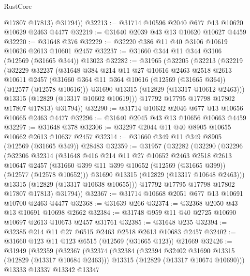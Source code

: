 \begin{lexlean}{RustCore}
\begin{coremodule}
          @17807
          @17813)
        @31794))
@32213 := @31714 @10596 @2040 @677 @13 @10620 @10629 @2463 @4477
@32219 := @31640 @2039 @43 @13 @10620 @10627 @4459
@32220 := @31648 @376
@32229 := @32220 @386 @11 @40 @3106 @10619 @10626 @2613 @10601 @2457
@32237 := @31660 @344 @11 @344 @3106 (@12569 (@31665 @344)) @13023
@32282 := @31965
    (@32205
      (@32213
        (@32219
          (@32229
            @32237
            (@31648
              @384
              @214
              @11
              @27
              @10616
              @2463
              @2518
              @2613
              @10611
              @2457
              (@31660 @364 @11 @364 @10616 (@12569 (@31665 @364)) (@12577 (@12578 @10616)))
              @31690
              @13315
              (@12829 (@13317 @10612 @2463)))
            @13315
            (@12829 (@13317 @10602 @10619)))
          @17792
          @17795
          @17798
          @17802
          @17807
          @17813)
        @31794))
@32290 := @31714 @10632 @2046 @677 @13 @10656 @10665 @2463 @4477
@32296 := @31640 @2045 @43 @13 @10656 @10663 @4459
@32297 := @31648 @378
@32306 := @32297 @2044 @11 @40 @8905 @10655 @10662 @2613 @10637 @2457
@32314 := @31660 @349 @11 @349 @8905 (@12569 (@31665 @349)) @28483
@32359 := @31957
    (@32282
      (@32290
        (@32296
          (@32306
            @32314
            (@31648
              @416
              @214
              @11
              @27
              @10652
              @2463
              @2518
              @2613
              @10647
              @2457
              (@31660 @399 @11 @399 @10652 (@12569 (@31665 @399)) (@12577 (@12578 @10652)))
              @31690
              @13315
              (@12829 (@13317 @10648 @2463)))
            @13315
            (@12829 (@13317 @10638 @10655)))
          @17792
          @17795
          @17798
          @17802
          @17807
          @17813)
        @31794))
@32367 := @31714 @10668 @2051 @677 @13 @10691 @10700 @2463 @4477
@32368 := @31639 @266
@32374 := @32368 @2050 @43 @13 @10691 @10698 @2662
@32384 := @31748 @959 @11 @40 @2725 @10690 @10697 @2613 @10673 @2457 @31761
@32385 := @31648 @235
@32394 := @32385 @214 @11 @27 @6515 @2463 @2518 @2613 @10683 @2457
@32402 := @31660 @123 @11 @123 @6515 (@12569 (@31665 @123)) @21669
@32426 := @31949
    (@32359
      (@32367
        (@32374
          (@32384
            (@32394 @32402 @31690 @13315 (@12829 (@13317 @10684 @2463)))
            @13315
            (@12829 (@13317 @10674 @10690)))
          @13333
          @13337
          @13342
          @13347

\end{coremodule}
\end{lexlean}
